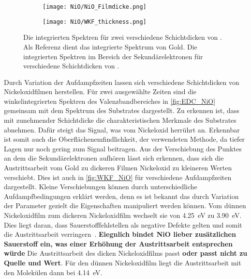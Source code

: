         \begin{figure}
            \centering
            \begin{subfigure}[t]{0.48\textwidth}
                \centering
                \texttt{[image: NiO/NiO\_Filmdicke.png]}
                \subcaption{}
                \label{fig:EDC_NiO}
            \end{subfigure}
            \begin{subfigure}[t]{0.48\textwidth}
                \centering
                \texttt{[image: NiO/WKF\_thickness.png]}
                \caption{}
                \label{fig:WKF_NiO}
            \end{subfigure}
            \caption{ Die integrierten Spektren für zwei verschiedene Schichtdicken von . Als Referenz dient das integrierte Spektrum von Gold. 
             Die integrierten Spektren im Bereich der Sekundärelektronen für verschiedene Schichtdicken von .}
        \end{figure}
        Durch Variation der Aufdampfzeiten lassen sich verschiedene Schichtdicken von Nickeloxidfilmen herstellen.
        Für zwei ausgewählte Zeiten sind die winkelintegrierten Spektren des Valenzbandbereiches in \autoref{fig:EDC_NiO} gemeinsam mit dem Spektrum des Substrates dargestellt.
        Zu erkennen ist, dass mit zunehmender Schichtdicke die charakteristischen Merkmale des Substrates abnehmen.
        Dafür steigt das Signal, was vom Nickeloxid herrührt an.
        Erkennbar ist somit auch die Oberflächenemfindlichkeit, der verwendeten Methode, da tiefer Lagen nur noch gering zum Signal beitragen.
        Aus der Verschiebung des Punktes an dem die Sekundärelektronen aufhören lässt sich erkennen, dass sich die Austrittsarbeit vom Gold zu dickeren Filmen Nickeloxid zu kleineren Werten verschiebt.
        Dies ist auch in \autoref{fig:WKF_NiO} für verschiedene Aufdampfzeiten dargestellt. 
        Kleine Verschiebungen können durch unterschiedliche Aufdampfbedingungen erklärt werden, denn es ist bekannt das durch Variation der Parameter gezielt die Eigenschaften manipuliert werden können.
        Vom dünnen Nickeloxidfilm zum dickeren Nickeloxidfilm wechselt sie von \SI{4.25}{\electronvolt} zu \SI{3.90}{\electronvolt}.
        Dies liegt daran, dass Sauerstofffehlstellen als negative Defekte gelten und somit die Austrittsarbeit verringern~\cite{IF_3}. \textbf{Eiegnlich bindet NiO lieber zusätzlichen Sauerstoff ein, was einer Erhöhung der Austrittsarbeit entsprechen würde}
        Die Austrittsarbeit des dicken Nickeloxidfilms passt \textbf{oder passt nicht zu Quelle und Wert}.
        Für den dünnen Nickeloxidfilm liegt die Austrittsarbeit mit den Molekülen dann bei \SI{4.14}{\electronvolt}.

